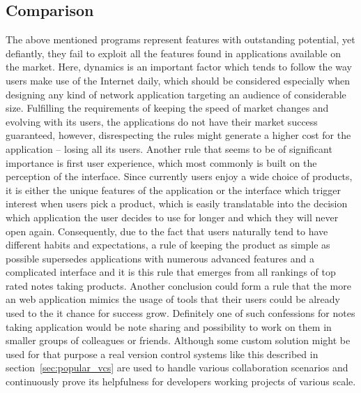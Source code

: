 \subsection{Comparison}
The above mentioned programs represent features with outstanding potential, yet defiantly, they fail to exploit all the features found in applications available on the market. Here, dynamics is an important factor which tends to follow the way users make use of the Internet daily, which should be considered especially when designing any kind of network application targeting an audience of considerable size. Fulfilling the requirements of keeping the speed of market changes and evolving with its users, the applications do not have their market success guaranteed, however, disrespecting the rules might generate a higher cost for the application -- losing all its users. Another rule that seems to be of significant importance is first user experience, which most commonly is built on the perception of the interface. Since currently users enjoy a wide choice of products, it is either the unique features of the application or the interface which trigger interest when users pick a product, which is easily translatable into the decision which application the user decides to use for longer and which they will never open again. Consequently, due to the fact that users naturally tend to have different habits and expectations, a rule of keeping the product as simple as possible supersedes applications with numerous advanced features and a complicated interface and it is this rule that emerges from all rankings of top rated notes taking products. Another conclusion could form a rule that the more an web application mimics the usage of tools that their users could be already used to the it chance for success grow. Definitely one of such confessions for notes  taking application would be note sharing and possibility to work on them in smaller groups of colleagues or friends. Although some custom solution might be used for that purpose a real version control systems like this described in section~\ref{sec:popular_vcs} are used to handle various collaboration scenarios and continuously prove its helpfulness for developers working projects of various scale. 

